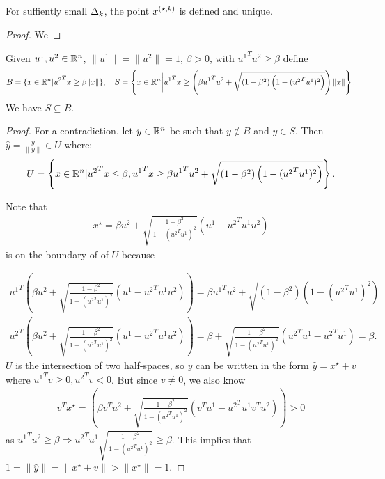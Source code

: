 \begin{theorem}
For suffiently small $\Delta_k$, the point ${x^{(\star, k)}}$ is defined and unique.
\end{theorem}

\begin{proof}
We 
\end{proof}




\begin{theorem}
\label{cone_subset_cone}
Given $u^1, u^2 \in {\mathbb R^{n}}$, $\|u^1\| = \|u^2\|= 1$, $\beta >0$, with ${u^1}^Tu^2 \ge \beta$ define
\begin{align*}
B = \{x\in{\mathbb R^{n}} | {u^2}^Tx \ge \beta\|x\|\}, \quad
S = \left\{x\in{\mathbb R^{n}} \bigg| {u^1}^Tx \ge \left(\beta {u^1}^Tu^2 + \sqrt{(1 - \beta^2)\left(1 - ({u^2}^Tu^1)^2\right)}\right)\|x\| \right\}. 
\end{align*}
We have $S \subseteq B$.
\end{theorem}


\begin{proof}
For a contradiction, let $y \in {\mathbb R^{n}}$ be such that $y \not \in B$ and $y \in S$.
Then $\hat y = \frac{y}{\|y\|} \in U$ where:
\begin{align*}
U = \left\{x \in {\mathbb R^{n}} | {u^2}^Tx \le \beta, {u^1}^Tx \ge \beta {u^1}^Tu^2 + \sqrt{(1 - \beta^2)\left(1 - ({u^2}^Tu^1)^2\right)} \right\}.
\end{align*}

Note that
\begin{align*}
x^{\star} = \beta u^2 + \sqrt{\frac{1 - \beta^2}{1 - ({u^2}^Tu^1)^2}} (u^1 - {u^2}^Tu^1 u^2 )
\end{align*}
is on the boundary of of $U$ because

\begin{align*}
{u^1}^T\left(\beta u^2 + \sqrt{\frac{1 - \beta^2}{1 - ({u^2}^Tu^1)^2}} (u^1 - {u^2}^Tu^1 u^2 )\right) = 
\beta {u^1}^Tu^2 + \sqrt{(1 - \beta^2)\left(1 - ({u^2}^Tu^1)^2\right)} \\
{u^2}^T\left(\beta u^2 + \sqrt{\frac{1 - \beta^2}{1 - ({u^2}^Tu^1)^2}} (u^1 - {u^2}^Tu^1 u^2 )\right) = 
\beta + \sqrt{\frac{1 - \beta^2}{1 - ({u^2}^Tu^1)^2}} ({u^2}^Tu^1 - {u^2}^Tu^1 ) = \beta.
\end{align*}
$U$ is the intersection of two half-spaces, so $\hat y$ can be written in the form $\hat y = x^{\star} + v$ where ${u^1}^Tv \ge 0, {u^2}^Tv < 0$.
But since $v \ne 0$, we also know
\begin{align*}
{v}^Tx^{\star} = 
\left(\beta {v}^Tu^2 + \sqrt{\frac{1 - \beta^2}{1 - ({u^2}^Tu^1)^2}} ({v}^Tu^1 - {u^2}^Tu^1 {v}^Tu^2 )\right) > 0
\end{align*}
as ${u^1}^Tu^2 \ge \beta \Longrightarrow {u^2}^Tu^1\sqrt{\frac{1 - \beta^2}{1 - ({u^2}^Tu^1)^2}} \ge \beta$.
This implies that $1 = \|\hat y\| = \|x^{\star} + v\| > \|x^{\star}\| = 1$.
\end{proof}







